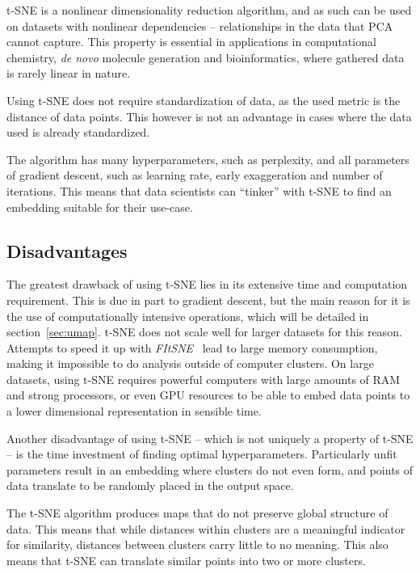 t-SNE is a nonlinear dimensionality reduction algorithm, and as such can be used on datasets with nonlinear dependencies -- relationships in the data that PCA cannot capture. This property is essential in applications in computational chemistry, \textit{de novo} molecule generation and bioinformatics, where gathered data is rarely linear in nature.

Using t-SNE does not require standardization of data, as the used metric is the distance of data points. This however is not an advantage in cases where the data used is already standardized.

The algorithm has many hyperparameters, such as perplexity, and all parameters of gradient descent, such as learning rate, early exaggeration and number of iterations. This means that data scientists can ``tinker'' with t-SNE to find an embedding suitable for their use-case.

\subsection{Disadvantages}

The greatest drawback of using t-SNE lies in its extensive time and computation requirement. This is due in part to gradient descent, but the main reason for it is the use of computationally intensive operations, which will be detailed in section~\ref{sec:umap}. t-SNE does not scale well for larger datasets for this reason. Attempts to speed it up with \textit{FItSNE}~\cite{bib:tsne:FItSNE} lead to large memory consumption, making it impossible to do analysis outside of computer clusters. On large datasets, using t-SNE requires powerful computers with large amounts of RAM and strong processors, or even GPU resources to be able to embed data points to a lower dimensional representation in sensible time.

Another disadvantage of using t-SNE -- which is not uniquely a property of t-SNE -- is the time investment of finding optimal hyperparameters. Particularly unfit parameters result in an embedding where clusters do not even form, and points of data translate to be randomly placed in the output space.~\cite{bib:distill}

The t-SNE algorithm produces maps that do not preserve global structure of data. This means that while distances within clusters are a meaningful indicator for similarity, distances between clusters carry little to no meaning. This also means that t-SNE can translate similar points into two or more clusters.

